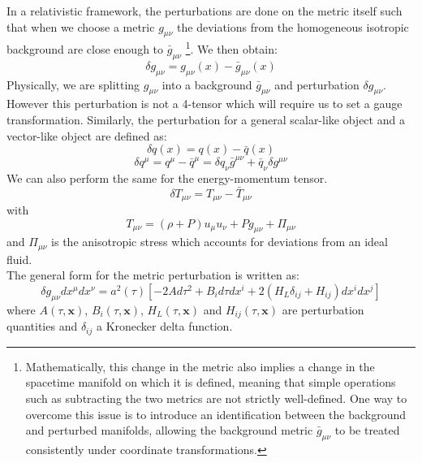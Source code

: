 In a relativistic framework, the perturbations are done on the metric itself such that when we choose a metric $g_{\mu \nu}$ the deviations from the homogeneous isotropic 
background are close enough to $\bar{g}_{\mu \nu}$
\footnote{Mathematically, this change in the metric also implies a change 
in the spacetime manifold on which it is defined, meaning that simple operations such as subtracting the two metrics are not strictly well-defined. 
One way to overcome this issue is to introduce an identification between the background and perturbed manifolds, allowing the background 
metric $\bar{g}_{\mu\nu}$ to be treated consistently under coordinate transformations.}. 
We then obtain:
\begin{equation}
    \delta g_{\mu \nu} = g_{\mu \nu}(x) - \bar{g}_{\mu \nu}(x)
\end{equation} 
Physically, we are splitting $g_{\mu \nu}$ into a background $\bar{g}_{\mu \nu}$ and perturbation $ \delta g_{\mu \nu}$. However this perturbation is not a 4-tensor which will 
require us to set a gauge transformation. Similarly, the perturbation for a general scalar-like object and a vector-like object are defined as:
\begin{equation}
    \delta q(x) = q(x) - \bar{q}(x)
\end{equation}
\begin{equation}
    \delta q^{\mu} = q^{\mu} - \bar{q}^{\mu} = \delta q_{\nu} \bar{g}^{\mu \nu} + \bar{q}_{\nu} \delta g^{\mu \nu}
\end{equation}
We can also perform the same for the energy-momentum tensor.
\begin{equation}
    \delta T_{\mu \nu} = T_{\mu \nu} - \bar{T}_{\mu \nu}
\end{equation}
with 
\begin{equation}
    T_{\mu \nu} = (\rho + P)u_{\mu}u_{\nu} + P g_{\mu \nu} + \Pi_{\mu \nu}
\end{equation}
and $\Pi_{\mu \nu}$ is the anisotropic stress which accounts for deviations from an ideal fluid. \\

The general form for the metric perturbation is written as:
\begin{equation}
    \delta g_{\mu \nu} dx^{\mu} dx^{\nu} = a^2(\tau)\left[ -2A d\tau^2 + B_i d\tau dx^i + 2(H_L \delta_{ij} + H_{ij})dx^i dx^j \right]
\end{equation}
where $A(\tau, \mathbf{x})$, $B_i(\tau, \mathbf{x})$, $H_L(\tau, \mathbf{x})$ and $H_{ij}(\tau, \mathbf{x})$ are perturbation quantities and $\delta_{ij}$ a Kronecker delta function.\\

